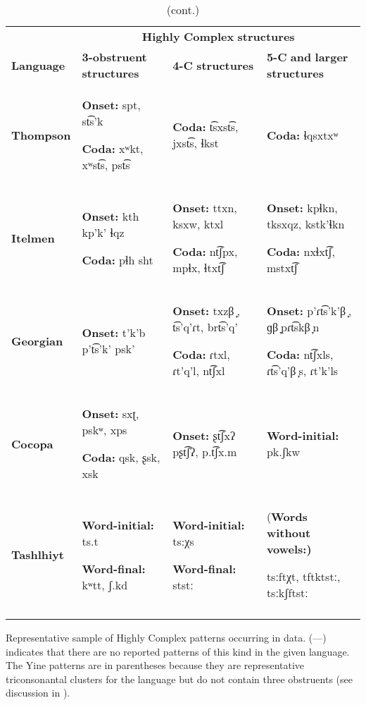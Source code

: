 \begin{table}
\begin{tabularx}{\textwidth}{XXXX}
 & \multicolumn{3}{c}{ \textbf{Highly} \textbf{Complex} \textbf{structures}}\\
\lsptoprule
\textbf{Language} & \textbf{3-obstruent} \textbf{structures} & \textbf{4-C} \textbf{structures} & \textbf{5-C} \textbf{and} \textbf{larger} \textbf{structures}\\
\textbf{Thompson} & \textbf{Onset:} spt, st͡s’k

\textbf{Coda:} xʷkt, xʷst͡s, pst͡s & \textbf{Coda:} t͡sxst͡s, jxst͡s, ɬkst & \textbf{Coda:} ɬqsxtxʷ\\
\textbf{Itelmen} & \textbf{Onset:} kth kp'k' ɬqz

\textbf{Coda:} pɬh sht & \textbf{Onset:} ttxn, ksxw, ktxl

\textbf{Coda:} nt͡ʃpx, mpɬx, ɬtxt͡ʃ & \textbf{Onset:} kpɬkn, tksxqz, kstk’ɬkn

\textbf{Coda:} nxɬxt͡ʃ, mstxt͡ʃ\\
\textbf{Georgian} & \textbf{Onset:} t'k'b p't͡s'k' psk’ & \textbf{Onset:} txzβ ̞, t͡s’q’ɾt, brt͡s'q{}'

\textbf{Coda:} ɾtxl, ɾt'q'l, nt͡ʃxl & \textbf{Onset:} p’ɾt͡s’k’β ̞, ɡβ ̞pɾt͡skβ ̞n

\textbf{Coda:} nt͡ʃxls, ɾt͡s’q’β ̞s, ɾt'k'ls\\
\textbf{Cocopa} & \textbf{Onset:} sxʈ, pskʷ, xps

\textbf{Coda:} qsk, ʂsk, xsk & \textbf{Onset:} ʂt͡ʃxʔ pʂt͡ʃʔ, p.t͡ʃx.m & \textbf{Word-initial:} pk.ʃkw\\
\textbf{Tashlhiyt} & \textbf{Word-initial:} ts.t

\textbf{Word-final:} kʷtt, ʃ.kd & \textbf{Word-initial:} ts:χs

\textbf{Word-final:} ststː & (\textbf{Words} \textbf{without} \textbf{vowels:)}

tsːftχt, tftktstː, tsːkʃftstː\\
\lspbottomrule
\end{tabularx}
{{\caption{\label{tab:key:3.12} (cont.)} Representative sample of Highly Complex patterns occurring in data. (—) indicates that there are no reported patterns of this kind in the given language. The Yine patterns are in parentheses because they are representative triconsonantal clusters for the language but do not contain three obstruents (see discussion in ).}}
\end{table}

